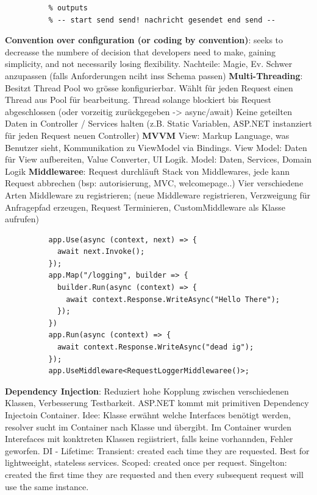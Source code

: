 \documentclass[10pt,landscape]{article}
\begin{document}
\begin{multicols}{3}
\begin{lstlisting}
          % outputs
          % -- start send send! nachricht gesendet end send -- 
        \end{lstlisting}
        \textbf{Convention over configuration (or coding by convention)}: seeks to decreasse the numbere of decision that developers need to make, gaining simplicity, and not necessarily losing flexibility.
        Nachteile: Magie, Ev. Schwer anzupassen (falls Anforderungen nciht inss Schema passen)
        \textbf{Multi-Threading}: Besitzt Thread Pool wo grösse konfigurierbar. Wählt für jeden Request einen Thread aus Pool für bearbeitung.
        Thread solange blockiert bis Request abgeschlossen (oder vorzeitig zurückgegeben -> async/await)
        Keine geteilten Daten in Controller / Services halten (z.B. Static Variablen, ASP.NET instanziert für jeden Request neuen Controller)
        \textbf{MVVM} View: Markup Language, was Benutzer sieht, Kommunikation zu ViewModel via Bindings. View Model: Daten für View aufbereiten, Value Converter, UI Logik. Model: Daten, Services, Domain Logik
        \textbf{Middlewaree}: Request durchläuft Stack von Middlewares, jede kann Request abbrechen (bsp: autorisierung, MVC, welcomepage..)
        Vier verschiedene Arten Middleware zu registrieren; (neue Middleware registrieren, Verzweigung für Anfragepfad erzeugen, Request Terminieren, CustomMiddleware als Klasse aufrufen)
        \begin{lstlisting}
          app.Use(async (context, next) => {
            await next.Invoke();
          });
          app.Map("/logging", builder => {
            builder.Run(async (context) => {
              await context.Response.WriteAsync("Hello There");
            });
          })
          app.Run(async (context) => {
            await context.Response.WriteAsync("dead ig");
          });
          app.UseMiddleware<RequestLoggerMiddlewaree()>;
        \end{lstlisting}
        \textbf{Dependency Injection}: Reduziert hohe Kopplung zwischen verschiedenen Klassen, Verbesserung Testbarkeit. ASP.NET kommt mit primitiven Dependency Injectoin Container.
        Idee: Klasse erwähnt welche Interfaces benötigt werden, resolver sucht im Container nach Klasse und übergibt. Im Container wurden Interefaces mit konktreten Klassen regiistriert, falls keine vorhannden, Fehler geworfen.
        DI - Lifetime: Transient: created each time they are requested. Best for lightweeight, stateless services. Scoped: created once per request. Singelton: created the first time they are requested and then every subsequent request will use the same instance.

\end{multicols}
\end{document}
